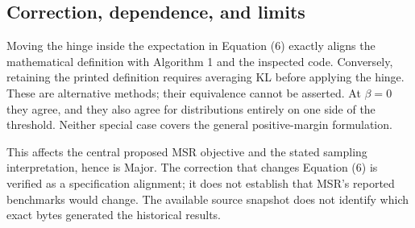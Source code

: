 \documentclass[10pt]{article}
\begin{document}
\subsection*{Correction, dependence, and limits}
Moving the hinge inside the expectation in Equation (6) exactly aligns the mathematical definition with Algorithm 1 and the inspected code. Conversely, retaining the printed definition requires averaging KL before applying the hinge. These are alternative methods; their equivalence cannot be asserted. At \(\beta=0\) they agree, and they also agree for distributions entirely on one side of the threshold. Neither special case covers the general positive-margin formulation.\par
This affects the central proposed MSR objective and the stated sampling interpretation, hence is Major. The correction that changes Equation (6) is verified as a specification alignment; it does not establish that MSR’s reported benchmarks would change. The available source snapshot does not identify which exact bytes generated the historical results.\par
\end{document}
